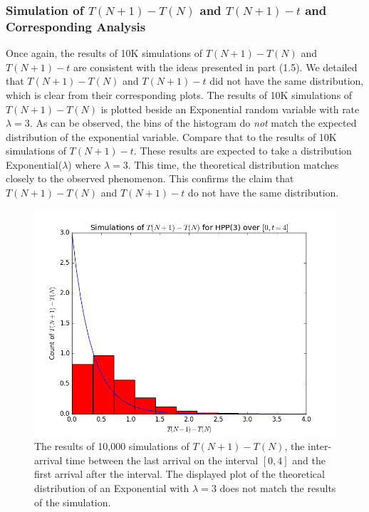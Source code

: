\documentclass[11pt, oneside]{article}   	%
\begin{document}
\subsubsection{Simulation of $T(N+1)-T(N)$ and $T(N+1)-t$ and Corresponding Analysis}
Once again, the results of 10K simulations of $T(N+1)-T(N)$ and $T(N+1)-t$ are consistent with the ideas presented in part (1.5). We detailed that $T(N+1)-T(N)$ and $T(N+1)-t$ did not have the same distribution, which is clear from their corresponding plots. The results of 10K simulations of $T(N+1)-T(N)$ is plotted beside an Exponential random variable with rate $\lambda=3$. As can be observed, the bins of the histogram do \emph{not} match the expected distribution of the exponential variable. Compare that to the results of 10K simulations of $T(N+1)-t$. These results are expected to take a distribution Exponential($\lambda$) where $\lambda=3$. This time, the theoretical distribution matches closely to the observed phenomenon. This confirms the claim that $T(N+1)-T(N)$ and $T(N+1)-t$ do not have the same distribution.
\begin{figure}[H]
\includegraphics[scale=.45]{hpp_tn1_tn}
\caption{The results of 10,000 simulations of $T(N+1)-T(N)$, the inter-arrival time between the last arrival on the interval $[0,4]$ and the first arrival after the interval. The displayed plot of the theoretical distribution of an Exponential with $\lambda=3$ does not match the results of the simulation.}
\label{fig:x}
\end{figure}
\end{document}
